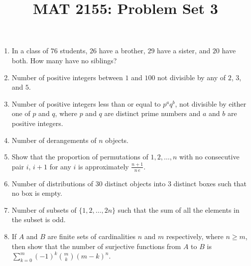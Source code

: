 \documentclass[svgnames]{amsart}
\title{MAT 2155: Problem Set 3}
\date{}
\begin{document}
\maketitle
\begin{enumerate}[leftmargin=*]
\item In a class of $76$ students, $26$ have a brother, $29$ have a sister, and $20$ have both. How many have no siblings?

\item Number of positive integers between $1$ and $100$ not divisible by any of $2$, $3$, and $5$.

\item Number of positive integers less than or equal to $p^a q^b$, not divisible by either one of $p$ and $q$, where $p$ and $q$ are distinct prime numbers and $a$ and $b$ are positive integers.

\item Number of derangements of $n$ objects.

\item Show that the proportion of permutations of $1, 2, \ldots, n$ with no consecutive pair $i$, $i + 1$ for any $i$ is approximately $\frac{n + 1}{n\,e}$.

\item Number of distributions of $30$ distinct objects into $3$ distinct boxes such that no box is empty.

\item Number of subsets of $\{1, 2, \ldots, 2n\}$ such that the sum of all the elements in the subset is odd.

\item If $A$ and $B$ are finite sets of cardinalities $n$ and $m$ respectively, where $n \ge m$, then show that the number of surjective functions from $A$ to $B$ is $\sum\limits_{k=0}^m (-1)^k \binom m k (m - k)^n$.

\end{enumerate}
\end{document}
